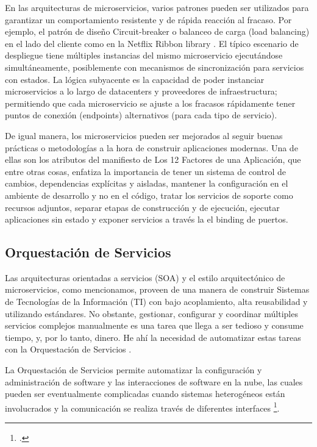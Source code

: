         En las arquitecturas de microservicios, varios patrones pueden ser utilizados para garantizar un comportamiento resistente y de rápida reacción al fracaso. Por ejemplo, el patrón de diseño Circuit-breaker \parencite{Nygard2007-ed} o balanceo de carga (load balancing) en el lado del cliente como en la Netflix Ribbon library \parencite{Netflix2016-ri}. El típico escenario de despliegue tiene múltiples instancias del mismo microservicio ejecutándose simultáneamente, posiblemente con mecanismos de sincronización para servicios con estados. La lógica subyacente es la capacidad de poder instanciar microservicios a lo largo de datacenters y proveedores de infraestructura; permitiendo que cada microservicio se ajuste a los fracasos rápidamente tener puntos de conexión (endpoints) alternativos (para cada tipo de servicio).
        
        De igual manera, los microservicios pueden ser mejorados al seguir buenas prácticas o metodologías a la hora de construir aplicaciones modernas. Una de ellas son los atributos del manifiesto de Los 12 Factores de una Aplicación, que entre otras cosas, enfatiza la importancia de tener un sistema de control de cambios, dependencias explícitas y aisladas, mantener la configuración en el ambiente de desarrollo y no en el código, tratar los servicios de soporte como recursos adjuntos, separar etapas de construcción y de ejecución, ejecutar aplicaciones sin estado y exponer servicios a través la el binding de puertos.

        
    \subsection{Orquestación de Servicios}
        Las arquitecturas orientadas a servicios (SOA) y el estilo arquitectónico de microservicios, como mencionamos, proveen de una manera de construir Sistemas de Tecnologías de la Información (TI) con bajo acoplamiento, alta reusabilidad y utilizando estándares. No obstante, gestionar, configurar y coordinar múltiples servicios complejos manualmente es una tarea que llega a ser tedioso y consume tiempo, y, por lo tanto, dinero. He ahí la necesidad de automatizar estas tareas con la Orquestación de Servicios \parencite{Kapuruge2014-qq}.
        
        La Orquestación de Servicios permite automatizar la configuración y administración de software y las interacciones de software en la nube, las cuales pueden ser eventualmente complicadas cuando sistemas heterogéneos están involucrados y la comunicación se realiza través de diferentes interfaces \footcite{Katsaros2016-bj}. 
        
